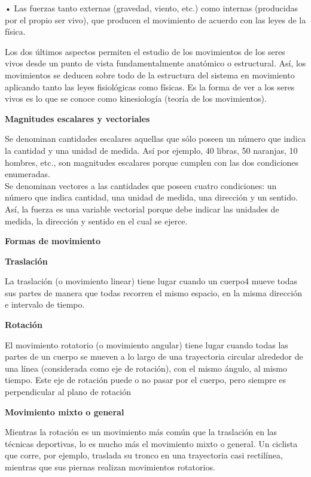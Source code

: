 \documentclass{article}
\begin{document}
•	Las fuerzas tanto externas (gravedad, viento, etc.) como internas (producidas por el propio ser vivo), que producen el movimiento de acuerdo con las leyes de la física.

Los dos últimos aspectos permiten el estudio de los movimientos de los seres vivos desde un punto de vista fundamentalmente anatómico o estructural. Así, los movimientos se deducen sobre todo de la estructura del sistema en movimiento aplicando tanto las leyes fisiológicas como físicas. Es la forma de ver a los seres vivos es lo que se conoce como kinesiología (teoría de los movimientos).

{\textbf{Magnitudes escalares y vectoriales}}

Se denominan cantidades escalares aquellas que sólo poseen un número que indica la cantidad y una unidad de medida. Así por ejemplo, 40 libras, 50 naranjas, 10 hombres, etc., son magnitudes escalares porque cumplen con las dos condiciones enumeradas.\\
Se denominan vectores a las cantidades que poseen cuatro condiciones: un número que indica cantidad, una unidad de medida, una dirección y un sentido. Así, la fuerza es una variable vectorial porque debe indicar las unidades de medida, la dirección y sentido en el cual se ejerce.
\vspace{5mm}


\item\cite{jose2009biomecanica}\textbf{Formas de movimiento} \

\textbf{Traslación}

La traslación (o movimiento linear) tiene lugar cuando un cuerpo4 mueve todas sus partes de manera que todas recorren el mismo espacio, en la misma dirección e intervalo de tiempo.
\vspace{5mm}

\textbf{Rotación}

El movimiento rotatorio (o movimiento angular) tiene lugar cuando todas las partes de un cuerpo se mueven a lo largo de una trayectoria circular alrededor de una línea (considerada como eje de rotación), con el mismo ángulo, al mismo tiempo. Este eje de rotación puede o no pasar por el cuerpo, pero siempre es perpendicular al plano de rotación
\vspace{5mm}

\textbf{Movimiento mixto o general}

Mientras la rotación es un movimiento más común que la traslación en las técnicas deportivas, lo es mucho más el movimiento mixto o general. Un ciclista que corre, por ejemplo, traslada su tronco en una trayectoria casi rectilínea, mientras que sus piernas realizan movimientos rotatorios.
\vspace{5mm}
\end{document}
